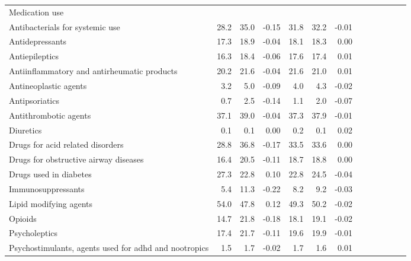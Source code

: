 \documentclass[11pt,]{article}
\begin{document}
\begin{longtable}{lrrrrrrrrrrrr}
  Medication use &    &    &     &    &    &     \\ 
      Antibacterials for systemic use & 28.2 & 35.0 & -0.15 & 31.8 & 32.2 & -0.01 \\ 
      Antidepressants & 17.3 & 18.9 & -0.04 & 18.1 & 18.3 &  0.00 \\ 
      Antiepileptics & 16.3 & 18.4 & -0.06 & 17.6 & 17.4 &  0.01 \\ 
      Antiinflammatory and antirheumatic products & 20.2 & 21.6 & -0.04 & 21.6 & 21.0 &  0.01 \\ 
      Antineoplastic agents &  3.2 &  5.0 & -0.09 &  4.0 &  4.3 & -0.02 \\ 
      Antipsoriatics &  0.7 &  2.5 & -0.14 &  1.1 &  2.0 & -0.07 \\ 
      Antithrombotic agents & 37.1 & 39.0 & -0.04 & 37.3 & 37.9 & -0.01 \\ 
      Diuretics &  0.1 &  0.1 &  0.00 &  0.2 &  0.1 &  0.02 \\ 
      Drugs for acid related disorders & 28.8 & 36.8 & -0.17 & 33.5 & 33.6 &  0.00 \\ 
      Drugs for obstructive airway diseases & 16.4 & 20.5 & -0.11 & 18.7 & 18.8 &  0.00 \\ 
      Drugs used in diabetes & 27.3 & 22.8 &  0.10 & 22.8 & 24.5 & -0.04 \\ 
      Immunosuppressants &  5.4 & 11.3 & -0.22 &  8.2 &  9.2 & -0.03 \\ 
      Lipid modifying agents & 54.0 & 47.8 &  0.12 & 49.3 & 50.2 & -0.02 \\ 
      Opioids & 14.7 & 21.8 & -0.18 & 18.1 & 19.1 & -0.02 \\ 
      Psycholeptics & 17.4 & 21.7 & -0.11 & 19.6 & 19.9 & -0.01 \\ 
      Psychostimulants, agents used for adhd and nootropics &  1.5 &  1.7 & -0.02 &  1.7 &  1.6 &  0.01 \\ 
   \bottomrule\end{longtable}
\clearpage
{}
\end{document}
